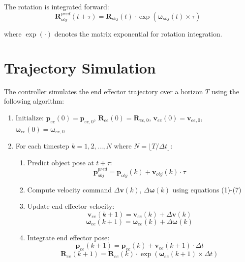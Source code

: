 \documentclass{article}
\begin{document}
The rotation is integrated forward:
\begin{equation}
    \bm{R}_{obj}^{pred}(t + \tau) = \bm{R}_{obj}(t) \cdot \exp(\bm{\omega}_{obj}(t) \times \tau)
\end{equation}

where $\exp(\cdot)$ denotes the matrix exponential for rotation integration.

\section{Trajectory Simulation}

The controller simulates the end effector trajectory over a horizon $T$ using the following algorithm:

\begin{enumerate}
    \item Initialize: $\bm{p}_{ee}(0) = \bm{p}_{ee,0}$, $\bm{R}_{ee}(0) = \bm{R}_{ee,0}$, $\bm{v}_{ee}(0) = \bm{v}_{ee,0}$, $\bm{\omega}_{ee}(0) = \bm{\omega}_{ee,0}$
    
    \item For each timestep $k = 1, 2, \ldots, N$ where $N = \lfloor T / \Delta t \rfloor$:
    \begin{enumerate}
        \item Predict object pose at $t + \tau$:
        \begin{equation}
            \bm{p}_{obj}^{pred} = \bm{p}_{obj}(k) + \bm{v}_{obj}(k) \cdot \tau
        \end{equation}
        
        \item Compute velocity command $\Delta \bm{v}(k)$, $\Delta \bm{\omega}(k)$ using equations (1)-(7)
        
        \item Update end effector velocity:
        \begin{equation}
            \bm{v}_{ee}(k+1) = \bm{v}_{ee}(k) + \Delta \bm{v}(k)
        \end{equation}
        \begin{equation}
            \bm{\omega}_{ee}(k+1) = \bm{\omega}_{ee}(k) + \Delta \bm{\omega}(k)
        \end{equation}
        
        \item Integrate end effector pose:
        \begin{equation}
            \bm{p}_{ee}(k+1) = \bm{p}_{ee}(k) + \bm{v}_{ee}(k+1) \cdot \Delta t
        \end{equation}
        \begin{equation}
            \bm{R}_{ee}(k+1) = \bm{R}_{ee}(k) \cdot \exp(\bm{\omega}_{ee}(k+1) \times \Delta t)
        \end{equation}
        

\end{enumerate}
\end{enumerate}
\end{document}
